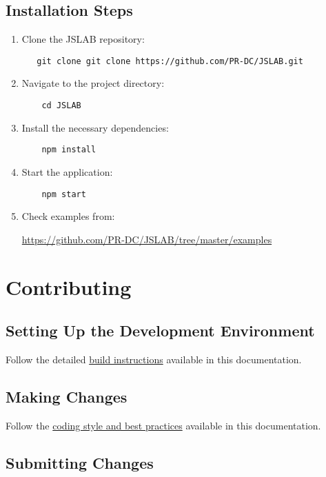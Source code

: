 \documentclass[12pt,a4paper]{article}
\begin{document}
\subsection{Installation Steps}
\begin{enumerate}
    \item Clone the JSLAB repository:
\begin{verbatim}
   git clone git clone https://github.com/PR-DC/JSLAB.git
\end{verbatim}
    
    \item Navigate to the project directory:
\begin{verbatim}
    cd JSLAB
\end{verbatim}

    \item Install the necessary dependencies:
\begin{verbatim}
    npm install
\end{verbatim}

    \item Start the application:
\begin{verbatim}
    npm start
\end{verbatim}

    \item Check examples from:

    \url{https://github.com/PR-DC/JSLAB/tree/master/examples}

\end{enumerate}

\section{Contributing}

\subsection{Setting Up the Development Environment}

Follow the detailed \hyperref[build-instructions]{build instructions} available in this documentation.

\subsection{Making Changes}

Follow the \hyperref[coding-style]{coding style and best practices} available in this documentation.

\subsection{Submitting Changes}
\end{document}
